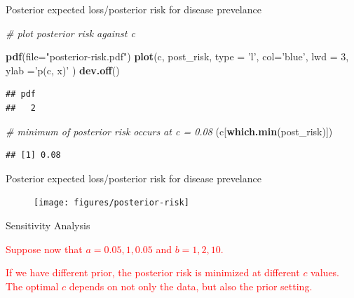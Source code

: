 \documentclass[
  ignorenonframetext,
]{beamer}
\newenvironment{Shaded}{\begin{snugshade}}{\end{snugshade}}
\newcommand{\CommentTok}[1]{\textcolor[rgb]{0.56,0.35,0.01}{\textit{#1}}}
\newcommand{\DataTypeTok}[1]{\textcolor[rgb]{0.13,0.29,0.53}{#1}}
\newcommand{\DecValTok}[1]{\textcolor[rgb]{0.00,0.00,0.81}{#1}}
\newcommand{\KeywordTok}[1]{\textcolor[rgb]{0.13,0.29,0.53}{\textbf{#1}}}
\newcommand{\NormalTok}[1]{#1}
\newcommand{\StringTok}[1]{\textcolor[rgb]{0.31,0.60,0.02}{#1}}
\begin{document}
\begin{frame}[fragile]{Posterior expected loss/posterior risk for
disease prevelance}
\protect\hypertarget{posterior-expected-lossposterior-risk-for-disease-prevelance}{}

\begin{Shaded}
\begin{Highlighting}[]
\CommentTok{# plot posterior risk against c }

\KeywordTok{pdf}\NormalTok{(}\DataTypeTok{file=}\StringTok{"posterior-risk.pdf"}\NormalTok{)}
\KeywordTok{plot}\NormalTok{(c, post_risk, }\DataTypeTok{type =} \StringTok{'l'}\NormalTok{, }\DataTypeTok{col=}\StringTok{'blue'}\NormalTok{, }
    \DataTypeTok{lwd =} \DecValTok{3}\NormalTok{, }\DataTypeTok{ylab =}\StringTok{'p(c, x)'}\NormalTok{ )}
\KeywordTok{dev.off}\NormalTok{()}
\end{Highlighting}
\end{Shaded}

\begin{verbatim}
## pdf 
##   2
\end{verbatim}

\begin{Shaded}
\begin{Highlighting}[]
\CommentTok{# minimum of posterior risk occurs at c = 0.08}
\NormalTok{(c[}\KeywordTok{which.min}\NormalTok{(post_risk)])}
\end{Highlighting}
\end{Shaded}

\begin{verbatim}
## [1] 0.08
\end{verbatim}

\end{frame}

\begin{frame}{Posterior expected loss/posterior risk for disease
prevelance}
\protect\hypertarget{posterior-expected-lossposterior-risk-for-disease-prevelance-1}{}

\begin{figure}
  \begin{center}
    \texttt{[image: figures/posterior-risk]}
  \end{center}
  \caption{}
 \label{figure:rho}
\end{figure}

\end{frame}

\begin{frame}{Sensitivity Analysis}
\protect\hypertarget{sensitivity-analysis}{}

\textcolor{red}{Suppose now that $a = 0.05, 1, 0.05$ and $b = 1, 2, 10.$}

\textcolor{red}{If we have different prior, the posterior risk is minimized at different $c$ values. The optimal $c$ depends on not only the data, but also the prior setting.}

\end{frame}
\end{document}

